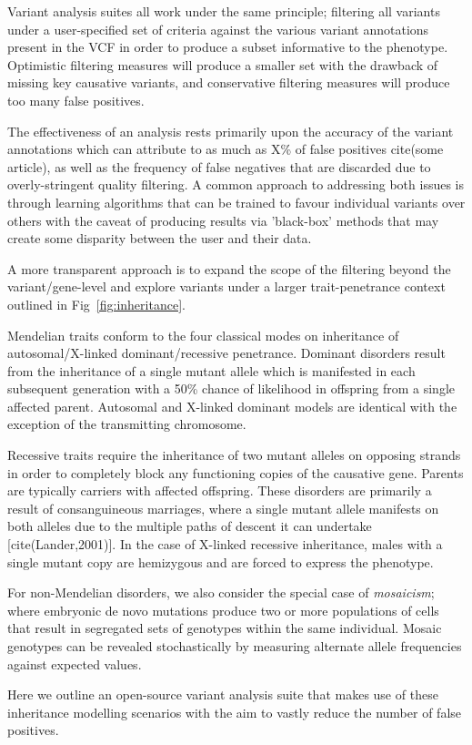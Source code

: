 Variant analysis suites all work under the same principle; filtering all variants under a user-specified set of criteria against the various variant annotations present in the VCF in order to produce a subset informative to the phenotype. Optimistic filtering measures will produce a smaller set with the drawback of missing key causative variants, and conservative filtering measures will produce too many false positives.

The effectiveness of an analysis rests primarily upon the accuracy of the variant annotations which can attribute to as much as X\% of false positives cite(some article), as well as the frequency of false negatives that are discarded due to overly-stringent quality filtering. A common approach to addressing both issues is through learning algorithms that can be trained to favour individual variants over others with the caveat of producing results via 'black-box' methods that may create some disparity between the user and their data. 

A more transparent approach is to expand the scope of the filtering beyond the variant/gene-level and explore variants under a larger trait-penetrance context outlined in Fig~\ref{fig:inheritance}. 

Mendelian traits conform to the four classical modes on inheritance of autosomal/X-linked dominant/recessive penetrance. Dominant disorders result from the inheritance of a single mutant allele which is manifested in each subsequent generation with a 50\% chance of likelihood in offspring from a single affected parent. Autosomal and X-linked dominant models are identical with the exception of the transmitting chromosome.

Recessive traits require the inheritance of two mutant alleles on opposing strands in order to completely block any functioning copies of the causative gene. Parents are typically carriers with affected offspring. These disorders are primarily a result of consanguineous marriages, where a single mutant allele manifests on both alleles due to the multiple paths of descent it can undertake [cite(Lander,2001)]. In the case of X-linked recessive inheritance, males with a single mutant copy are hemizygous and are forced to express the phenotype.

For non-Mendelian disorders, we also consider the special case of \textit{mosaicism}; where embryonic de novo mutations produce two or more populations of cells that result in segregated sets of genotypes within the same individual. Mosaic genotypes can be revealed stochastically by measuring alternate allele frequencies against expected values.

Here we outline an open-source variant analysis suite that makes use of these inheritance modelling scenarios with the aim to vastly reduce the number of false positives.



